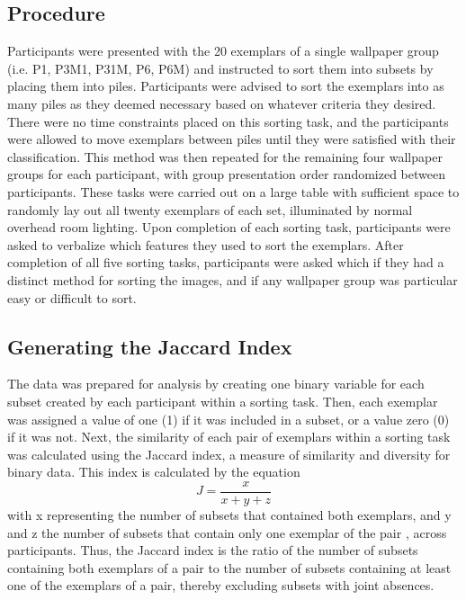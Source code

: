 \documentclass[11pt, twoside]{article}
\begin{document}
\subsection*{Procedure}
Participants were presented with the 20 exemplars of a single wallpaper group (i.e. P1, P3M1, P31M, P6, P6M) and instructed to sort them into subsets by placing them into piles. Participants were advised to sort the exemplars into as many piles as they deemed necessary based on whatever criteria they desired. There were no time constraints placed on this sorting task, and the participants were allowed to move exemplars between piles until they were satisfied with their classification. This method was then repeated for the remaining four wallpaper groups for each participant, with group presentation order randomized between participants. These tasks were carried out on a large table with sufficient space to randomly lay out all twenty exemplars of each set, illuminated by normal overhead room lighting. Upon completion of each sorting task, participants were asked to verbalize which features they used to sort the exemplars. After completion of all five sorting tasks, participants were asked which if they had a distinct method for sorting the images, and if any wallpaper group was particular easy or difficult to sort.

\subsection*{Generating the Jaccard Index}
The data was prepared for analysis by creating one binary variable for each subset created by each participant within a sorting task. Then, each exemplar was assigned a value of one (1) if it was included in a subset, or a value zero (0) if it was not. Next, the similarity of each pair of exemplars within a sorting task was calculated using the Jaccard index, a measure of similarity and diversity for binary data. This index is calculated by the equation  \[ J = \frac{x}{x + y + z} \] with x representing the number of subsets that contained both exemplars, and y and z the number of subsets that contain only one exemplar of the pair \citet{capra_factor_2005}, across participants. Thus, the Jaccard index is the ratio of the number of subsets containing both exemplars of a pair to the number of subsets containing at least one of the exemplars of a pair, thereby excluding subsets with joint absences.
\end{document}
